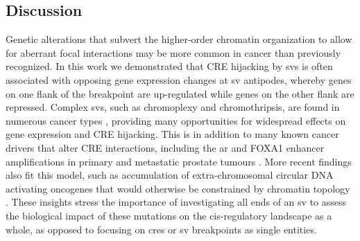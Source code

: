 \subsection{Discussion}

Genetic alterations that subvert the higher-order chromatin organization to allow for aberrant focal interactions may be more common in cancer than previously recognized.
In this work we demonstrated that CRE hijacking by \glspl{sv} is often associated with opposing gene expression changes at \gls{sv} antipodes, whereby genes on one flank of the breakpoint are up-regulated while genes on the other flank are repressed.
Complex \glspl{sv}, such as chromoplexy and chromothripsis, are found in numerous cancer types \cite{bacaPunctuatedEvolutionProstate2013,liPatternsSomaticStructural2020}, providing many opportunities for widespread effects on gene expression and CRE hijacking.
This is in addition to many known cancer drivers that alter CRE interactions, including the \gls{ar} and FOXA1 enhancer amplifications in primary and metastatic prostate tumours \cite{paroliaDistinctStructuralClasses2019,quigleyGenomicHallmarksStructural2018,takedaSomaticallyAcquiredEnhancer2018,zhouNoncodingMutationsTarget2020,kronTMPRSS2ERGFusion2017,viswanathanStructuralAlterationsDriving2018}.
More recent findings also fit this model, such as accumulation of extra-chromosomal circular DNA activating oncogenes that would otherwise be constrained by chromatin topology \cite{wuCircularEcDNAPromotes2019,kumarATACseqIdentifiesThousands2020,mortonFunctionalEnhancersShape2019,shoshaniChromothripsisDrivesEvolution2021}.
These insights stress the importance of investigating all ends of an \gls{sv} to assess the biological impact of these mutations on the cis-regulatory landscape as a whole, as opposed to focusing on \glspl{cre} or \gls{sv} breakpoints as single entities.

